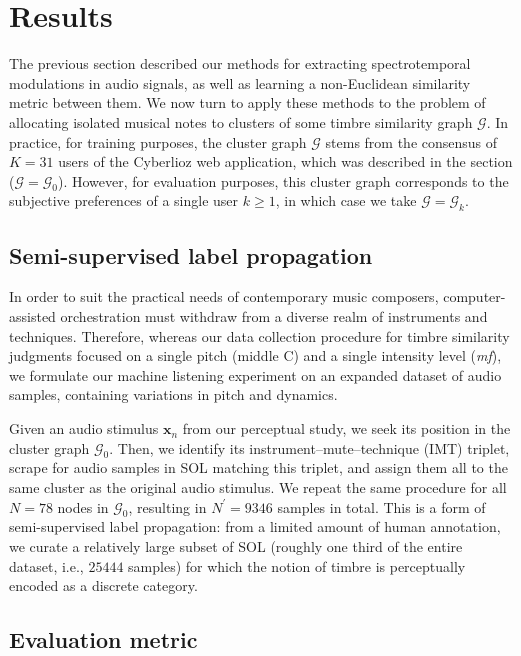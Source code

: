 \documentclass{bmcart}
\newcommand{\lnameref}[1]{%
\bgroup
\let\nmu\MakeLowercase
\nameref{#1}\egroup}
\newcommand{\nmu}{}
\begin{document}
\section*{\nmu Results}
\label{sec:results}

The previous section described our methods for extracting spectrotemporal modulations in audio signals, as well as learning a non-Euclidean similarity metric between them.
We now turn to apply these methods to the problem of allocating isolated musical notes to clusters of some timbre similarity graph $\mathcal{G}$.
In practice, for training purposes, the cluster graph $\mathcal{G}$ stems from the consensus of $K=31$ users of the Cyberlioz web application, which was described in the \lnameref{sec:data-collection} section ($\mathcal{G}=\mathcal{G}_0$).
However, for evaluation purposes, this cluster graph corresponds to the subjective preferences of a single user $k\geq 1$, in which case we take $\mathcal{G}=\mathcal{G}_k$.


\subsection*{Semi-supervised label propagation}

In order to suit the practical needs of contemporary music composers, computer-assisted orchestration must withdraw from a diverse realm of instruments and techniques.
Therefore, whereas our data collection procedure for timbre similarity judgments focused on a single pitch (middle C) and a single intensity level (\emph{mf}), we formulate our machine listening experiment on an expanded dataset of audio samples, containing variations in pitch and dynamics.

Given an audio stimulus $\boldsymbol{x}_n$ from our perceptual study, we seek its position in the cluster graph $\mathcal{G}_0$.
Then, we identify its instrument--mute--technique (IMT) triplet, scrape for audio samples in SOL matching this triplet, and assign them all to the same cluster as the original audio stimulus.
We repeat the same procedure for all $N=78$ nodes in $\mathcal{G}_0$, resulting in $N^\prime = 9346$ samples in total.
This is a form of semi-supervised label propagation: from a limited amount of human annotation, we curate a relatively large subset of SOL (roughly one third of the entire dataset, i.e., $25444$ samples) for which the notion of timbre is perceptually encoded as a discrete category.



\subsection*{Evaluation metric}
\end{document}
